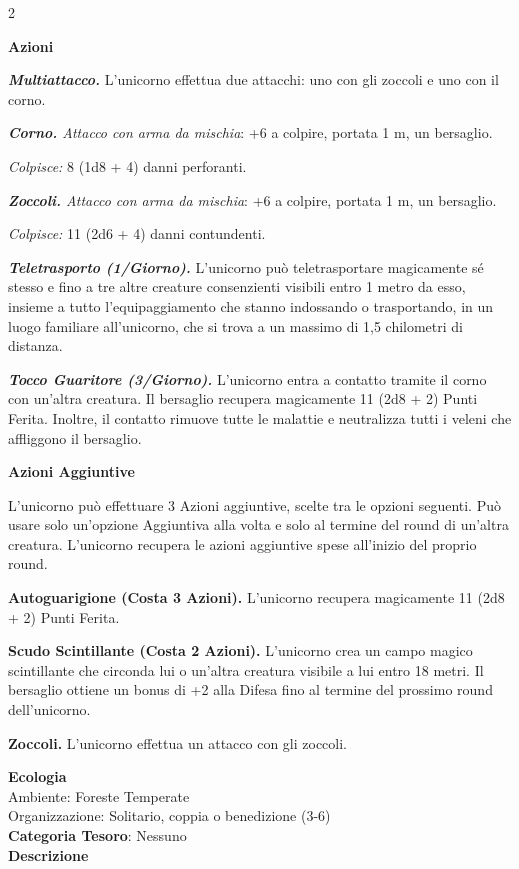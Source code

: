 \begin{multicols}{2}
{\textbf{Azioni}

\emph{\textbf{Multiattacco.}} L'unicorno effettua due attacchi: uno con gli zoccoli e uno con il corno.

\emph{\textbf{Corno.} Attacco con arma da mischia}: +6 a colpire, portata 1 m, un bersaglio.

\emph{Colpisce:} 8 (1d8 + 4) danni perforanti.

\emph{\textbf{Zoccoli.} Attacco con arma da mischia}: +6 a colpire, portata 1 m, un bersaglio.

\emph{Colpisce:} 11 (2d6 + 4) danni contundenti.

\emph{\textbf{Teletrasporto (1/Giorno).}} L'unicorno può teletrasportare magicamente sé stesso e fino a tre altre creature consenzienti visibili entro 1 metro da esso, insieme a tutto l'equipaggiamento che stanno indossando o trasportando, in un luogo familiare all'unicorno, che si trova a un massimo di 1,5 chilometri di distanza.

\emph{\textbf{Tocco Guaritore (3/Giorno).}} L'unicorno entra a contatto tramite il corno con un'altra creatura. Il bersaglio recupera magicamente 11 (2d8 + 2) Punti Ferita. Inoltre, il contatto rimuove tutte le malattie e neutralizza tutti i veleni che affliggono il bersaglio.

\textbf{Azioni Aggiuntive}

L'unicorno può effettuare 3 Azioni aggiuntive, scelte tra le opzioni seguenti. Può usare solo un'opzione Aggiuntiva alla volta e solo al termine del round di un'altra creatura. L'unicorno recupera le azioni aggiuntive spese all'inizio del proprio round.

\textbf{Autoguarigione (Costa 3 Azioni).} L'unicorno recupera magicamente 11 (2d8 + 2) Punti Ferita.

\textbf{Scudo Scintillante (Costa 2 Azioni).} L'unicorno crea un campo magico scintillante che circonda lui o un'altra creatura visibile a lui entro 18 metri. Il bersaglio ottiene un bonus di +2 alla Difesa fino al termine del prossimo round dell'unicorno.

\textbf{Zoccoli.} L'unicorno effettua un attacco con gli zoccoli.

\textbf{Ecologia}\\
Ambiente: Foreste Temperate\\
Organizzazione: Solitario, coppia o benedizione (3-6)\\
\textbf{Categoria Tesoro}: Nessuno\\
\textbf{Descrizione}\\

}
\end{multicols}
